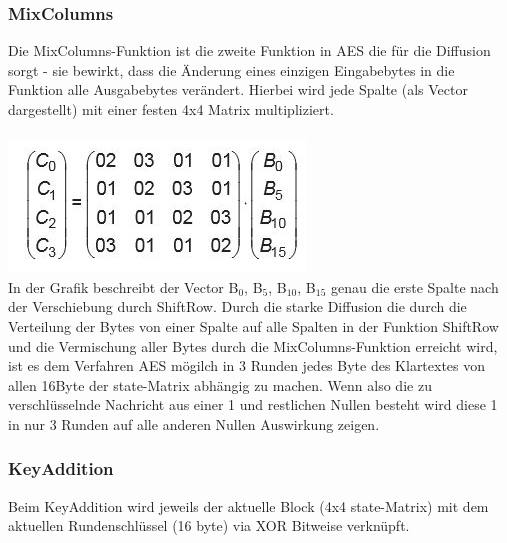 \documentclass[10pt, a4paper,headsepline]{scrreprt}
\begin{document}
\subsubsection{MixColumns}
Die MixColumns-Funktion ist die zweite Funktion in AES die für die Diffusion sorgt - sie bewirkt, dass die Änderung eines einzigen Eingabebytes in die Funktion alle Ausgabebytes verändert. Hierbei wird jede Spalte (als Vector dargestellt) mit einer festen 4x4 Matrix multipliziert. \\ \\
\includegraphics[scale=0.5]{aes_mixcol.JPG} \\
In der Grafik beschreibt der Vector B$_{0}$, B$_{5}$, B$_{10}$, B$_{15}$ genau die erste Spalte nach der Verschiebung durch ShiftRow. 
Durch die starke Diffusion die durch die Verteilung der Bytes von einer Spalte auf alle Spalten in der Funktion ShiftRow und die Vermischung aller Bytes durch die MixColumns-Funktion erreicht wird, ist es dem Verfahren AES mögilch in 3 Runden jedes Byte des Klartextes von allen 16Byte der state-Matrix abhängig zu machen. Wenn also die zu verschlüsselnde Nachricht aus einer 1 und restlichen Nullen besteht wird diese 1 in nur 3 Runden auf alle anderen Nullen Auswirkung zeigen.


\subsubsection{KeyAddition}
Beim KeyAddition wird jeweils der aktuelle Block (4x4 state-Matrix) mit dem aktuellen Rundenschlüssel (16 byte) via XOR Bitweise verknüpft. 
\end{document}

